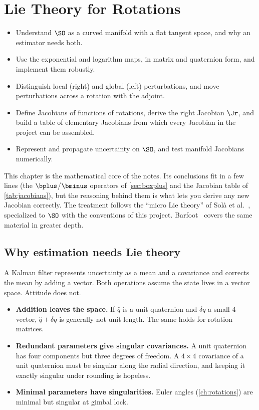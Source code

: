 \chapter{Lie Theory for Rotations}
\label{ch:lie}

\begin{objectives}
\begin{itemize}
  \item Understand $\SO$ as a curved manifold with a flat tangent space, and why an estimator needs both.
  \item Use the exponential and logarithm maps, in matrix and quaternion form, and implement them robustly.
  \item Distinguish local (right) and global (left) perturbations, and move perturbations across a
        rotation with the adjoint.
  \item Define Jacobians of functions of rotations, derive the right Jacobian $\Jr$, and build a table
        of elementary Jacobians from which every Jacobian in the project can be assembled.
  \item Represent and propagate uncertainty on $\SO$, and test manifold Jacobians numerically.
\end{itemize}
\end{objectives}

This chapter is the mathematical core of the notes. Its conclusions fit in a few lines (the
$\bplus$/$\bminus$ operators of \cref{sec:boxplus} and the Jacobian table of \cref{tab:jacobians}),
but the reasoning behind them is what lets you derive any new Jacobian correctly. The treatment
follows the ``micro Lie theory'' of Solà et al.~\cite{sola2018micro}, specialized to $\SO$ with the
conventions of this project. Barfoot~\cite{barfoot2017state} covers the same material in greater depth.

\section{Why estimation needs Lie theory}

A Kalman filter represents uncertainty as a mean and a covariance and corrects the mean by adding
a vector. Both operations assume the state lives in a vector space. Attitude does not.
\begin{itemize}
  \item \textbf{Addition leaves the space.} If $\hat q$ is a unit quaternion and $\delta q$ a small
        4-vector, $\hat q + \delta q$ is generally not unit length. The same holds for rotation matrices.
  \item \textbf{Redundant parameters give singular covariances.} A unit quaternion has four
        components but three degrees of freedom. A $4\times4$ covariance of a unit quaternion must be
        singular along the radial direction, and keeping it exactly singular under rounding is hopeless.
  \item \textbf{Minimal parameters have singularities.} Euler angles (\cref{ch:rotations}) are minimal
        but singular at gimbal lock.
\end{itemize}


